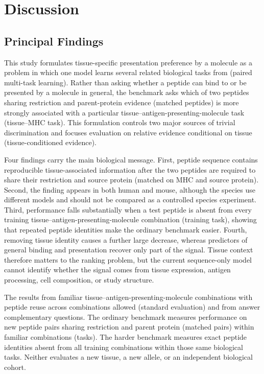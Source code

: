 \section{Discussion}

\subsection{Principal Findings}

This study formulates tissue-specific presentation preference by a \plainMHCI{} molecule as a problem in which one model learns several related biological tasks from \plainMatchedPairs{} (paired multi-task learning). Rather than asking whether a peptide can bind to or be presented by a \plainMHC{} molecule in general, the benchmark asks which of two peptides sharing \plainMHC{} restriction and parent-protein evidence (matched peptides) is more strongly associated with a particular tissue--antigen-presenting-molecule task (tissue--MHC task). This formulation controls two major sources of trivial discrimination and focuses evaluation on relative evidence conditional on tissue (tissue-conditioned evidence).

Four findings carry the main biological message. First, peptide sequence contains reproducible tissue-associated information after the two peptides are required to share their \plainMHC{} restriction and source protein (matched on MHC and source protein). Second, the finding appears in both human and mouse, although the species use different models and should not be compared as a controlled species experiment. Third, performance falls substantially when a test peptide is absent from every training tissue--antigen-presenting-molecule combination (training task), showing that repeated peptide identities make the ordinary benchmark easier. Fourth, removing tissue identity causes a further large decrease, whereas predictors of general \plainMHC{} binding and presentation recover only part of the signal. Tissue context therefore matters to the ranking problem, but the current sequence-only model cannot identify whether the signal comes from tissue expression, antigen processing, cell composition, or study structure.

The results from familiar tissue--antigen-presenting-molecule combinations with peptide reuse across combinations allowed (standard evaluation) and from \plainPeptideOOF{} answer complementary questions. The ordinary benchmark measures performance on new peptide pairs sharing restriction and parent protein (matched pairs) within familiar combinations (tasks). The harder benchmark measures exact peptide identities absent from all training combinations within those same biological tasks. Neither evaluates a new tissue, a new allele, or an independent biological cohort.

